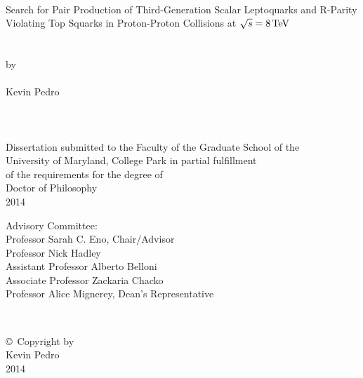 \documentclass[12pt]{thesis}  %
\renewcommand{\baselinestretch}{2}
\begin{document}
\thispagestyle{empty}
\hbox{\ }
\vspace{1in}
\renewcommand{\baselinestretch}{1}
\small\normalsize
\begin{center}

\large{Search for Pair Production of Third-Generation Scalar Leptoquarks and R-Parity Violating Top Squarks in Proton-Proton Collisions at $\sqrt{s} = 8\,\text{Te\hspace{-.08em}V}$}\\
\ \\
\ \\
\large{by} \\
\ \\
\large{Kevin Pedro}%
\ \\
\ \\
\ \\
\ \\
\normalsize
Dissertation submitted to the Faculty of the Graduate School of the \\
University of Maryland, College Park in partial fulfillment \\
of the requirements for the degree of \\
Doctor of Philosophy \\
2014
\end{center}

\vspace{7.5em}

\noindent Advisory Committee: \\
Professor Sarah C. Eno, Chair/Advisor \\
Professor Nick Hadley \\
Assistant Professor Alberto Belloni \\
Associate Professor Zackaria Chacko \\
Professor Alice Mignerey, Dean's Representative

\thispagestyle{empty}
\hbox{\ }

\vfill
\renewcommand{\baselinestretch}{1}
\small\normalsize

\vspace{-.65in}

\begin{center}
\large{\copyright \hbox{ }Copyright by\\
Kevin Pedro  %
\\
2014}
\end{center}

\vfill
 
\end{document}
